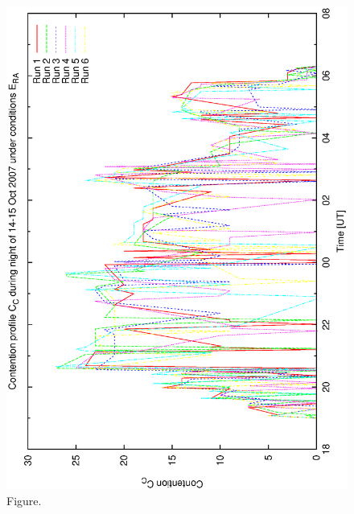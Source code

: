 \documentclass[12pt,a4paper]{article}
\begin{document}
\begin{figure}[htbp]
 \begin{center}
  \includegraphics[scale=1.0, angle=0]{figures/bsa_rnd_cont.eps}
 \end{center}
  \caption[Figure.]
{Figure.}
\end{figure}
\clearpage
\end{document}
